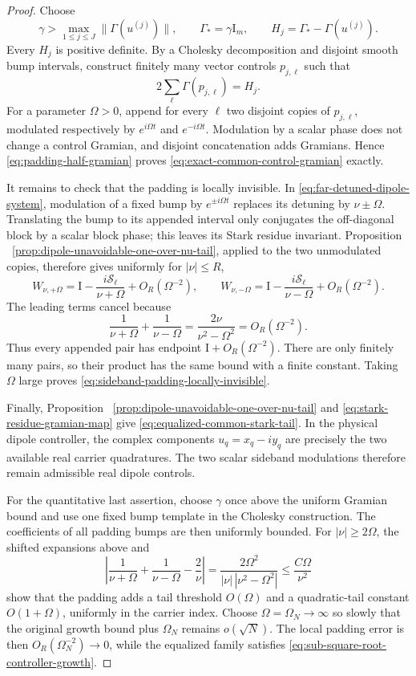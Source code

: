 \documentclass[11pt]{article}
\theoremstyle{remark}
\newcommand{\Id}{\mathrm I}
\begin{document}
\begin{proof}
Choose
\[
 \gamma>\max_{1\leq j\leq J}\|\Gamma(u^{(j)})\|,
 \qquad
 \Gamma_*=\gamma\Id_m,
 \qquad
 H_j=\Gamma_*-\Gamma(u^{(j)}).
\]
Every $H_j$ is positive definite.  By a Cholesky decomposition and disjoint
smooth bump intervals, construct finitely many vector controls
$p_{j,\ell}$ such that
\begin{equation}
 2\sum_\ell\Gamma(p_{j,\ell})=H_j.
 \label{eq:padding-half-gramian}
\end{equation}
For a parameter $\Omega>0$, append for every $\ell$ two disjoint copies of
$p_{j,\ell}$, modulated respectively by
$e^{i\Omega t}$ and $e^{-i\Omega t}$.  Modulation by a scalar phase does not
change a control Gramian, and disjoint concatenation adds Gramians.  Hence
\eqref{eq:padding-half-gramian} proves
\eqref{eq:exact-common-control-gramian} exactly.

It remains to check that the padding is locally invisible.  In
\eqref{eq:far-detuned-dipole-system}, modulation of a fixed bump by
$e^{\pm i\Omega t}$ replaces its detuning by $\nu\pm\Omega$.  Translating the
bump to its appended interval only conjugates the off-diagonal block by a
scalar block phase; this leaves its Stark residue invariant.  Proposition
~\ref{prop:dipole-unavoidable-one-over-nu-tail}, applied to the two unmodulated
copies, therefore gives uniformly for $|\nu|\leq R$,
\[
 W_{\nu,+\Omega}
 =
 \Id-\frac{i\mathcal S_\ell}{\nu+\Omega}+O_R(\Omega^{-2}),
 \qquad
 W_{\nu,-\Omega}
 =
 \Id-\frac{i\mathcal S_\ell}{\nu-\Omega}+O_R(\Omega^{-2}).
\]
The leading terms cancel because
\[
 \frac1{\nu+\Omega}+\frac1{\nu-\Omega}
 =\frac{2\nu}{\nu^2-\Omega^2}
 =O_R(\Omega^{-2}).
\]
Thus every appended pair has endpoint $\Id+O_R(\Omega^{-2})$.  There are only
finitely many pairs, so their product has the same bound with a finite
constant.  Taking $\Omega$ large proves
\eqref{eq:sideband-padding-locally-invisible}.

Finally, Proposition
~\ref{prop:dipole-unavoidable-one-over-nu-tail} and
\eqref{eq:stark-residue-gramian-map} give
\eqref{eq:equalized-common-stark-tail}.  In the physical dipole controller,
the complex components $u_q=x_q-iy_q$ are precisely the two available real
carrier quadratures.  The two scalar sideband modulations therefore remain
admissible real dipole controls.

For the quantitative last assertion, choose $\gamma$ once above the uniform
Gramian bound and use one fixed bump template in the Cholesky construction.
The coefficients of all padding bumps are then uniformly bounded.  For
$|\nu|\geq2\Omega$, the shifted expansions above and
\[
 \left|
  \frac1{\nu+\Omega}+\frac1{\nu-\Omega}-\frac2\nu
 \right|
 =
 \frac{2\Omega^2}{|\nu|\,|\nu^2-\Omega^2|}
 \leq\frac{C\Omega}{\nu^2}
\]
show that the padding adds a tail threshold $O(\Omega)$ and a quadratic-tail
constant $O(1+\Omega)$, uniformly in the carrier index.  Choose
$\Omega=\Omega_N\to\infty$ so slowly that the original growth bound plus
$\Omega_N$ remains $o(\sqrt N)$.  The local padding error is then
$O_R(\Omega_N^{-2})\to0$, while the equalized family satisfies
\eqref{eq:sub-square-root-controller-growth}.
\end{proof}
\end{document}
